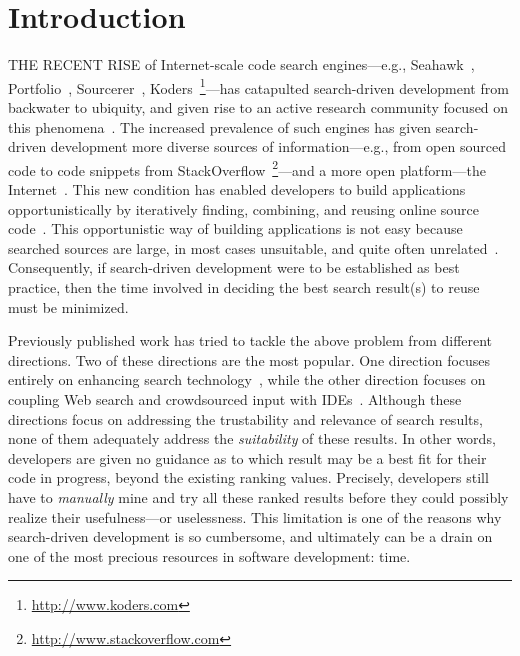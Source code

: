 \chapter{Introduction}{}
\label{sec:intro}

\lettrine[lraise=0.1, nindent=0em, slope=-.5em]{T}{HE RECENT RISE} of Internet-scale code search engines---e.g., Seahawk~\cite{Bacchelli:2012dl}, Portfolio~\cite{McMillan:2011wq}, Sourcerer~\cite{Bajracharya:2006vn}, Koders~\footnote{\url{http://www.koders.com}}---has catapulted search-driven development from backwater to ubiquity, and given rise to an active research community focused on this phenomena~\cite{Bajracharya:2009fj, Bajracharya:2010iy, Bajracharya:2011kw}. The increased prevalence of such engines has given search-driven development more diverse sources of information---e.g., from open sourced code to code snippets from StackOverflow~\footnote{\url{http://www.stackoverflow.com}}---and a more open platform---the Internet~\cite{GallardoValencia:2009gr, GallardoValencia:2010ij, Ying:2012tr}. This new condition has enabled developers to build applications opportunistically by iteratively finding, combining, and reusing online source code~\cite{Brandt:2008wi, Brandt:2009jb, Ying:2012tr}. This opportunistic way of building applications is not easy because searched sources are large, in most cases unsuitable, and quite often unrelated~\cite{GallardoValencia:2009gr}. Consequently, if search-driven development were to be established as best practice, then the time involved in deciding the best search result(s) to reuse must be minimized.

Previously published work has tried to tackle the above problem from different directions. Two of these directions are the most popular. One direction focuses entirely on enhancing search technology~\cite{Bajracharya:2010um, Gysin:2010kt, Mandelin:2005uj, McMillan:2011cm, McMillan:2012dj}, while the other direction focuses on coupling Web search and crowdsourced input with IDEs~\cite{Bacchelli:2012dl, Brandt:2010tp, Hartmann:2010hx, Hoffmann:2007wo, Wightman:2012gc}. Although these directions focus on addressing the trustability and relevance of search results, none of them adequately address the \emph{suitability} of these results. In other words, developers are given no guidance as to which result may be a best fit for their code in progress, beyond the existing ranking values. Precisely, developers still have to \emph{manually} mine and try all these ranked results before they could possibly realize their usefulness---or uselessness. This limitation is one of the reasons why search-driven development is so cumbersome, and ultimately can be a drain on one of the most precious resources in software development: time.

